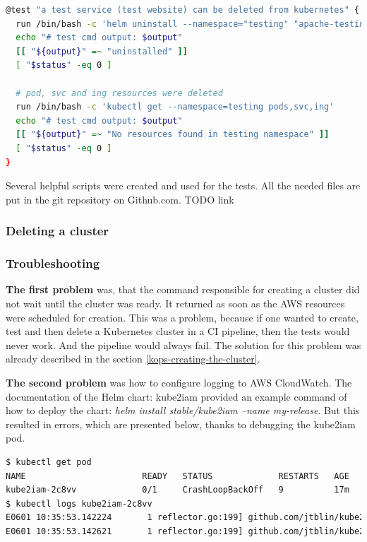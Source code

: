 \begin{lstlisting}[basicstyle=\tiny,caption={TODO},captionpos=b,language=Bash,xleftmargin=1cm]
@test "a test service (test website) can be deleted from kubernetes" {
  run /bin/bash -c 'helm uninstall --namespace="testing" "apache-testing" && kubectl delete -f config-map-www-contents.yaml && kubectl delete namespace "testing"'
  echo "# test cmd output: $output"
  [[ "${output}" =~ "uninstalled" ]]
  [ "$status" -eq 0 ]

  # pod, svc and ing resources were deleted
  run /bin/bash -c 'kubectl get --namespace=testing pods,svc,ing'
  echo "# test cmd output: $output"
  [[ "${output}" =~ "No resources found in testing namespace" ]]
  [ "$status" -eq 0 ]
}
\end{lstlisting}
Several helpful scripts were created and used for the tests. All the needed files are put in the git repository on Github.com. TODO link



\subsubsection{Deleting a cluster}

\subsubsection{Troubleshooting}

\textbf{The first problem} was, that the command responsible for creating a cluster did not wait until the cluster was ready. It returned as soon as the AWS resources were scheduled for creation. This was a problem, because if one wanted to create, test and then delete a Kubernetes cluster in a CI pipeline, then the tests would never work. And the pipeline would always fail. The solution for this problem was already described in the section \ref{kops-creating-the-cluster}.

\textbf{The second problem} was how to configure logging to AWS CloudWatch. The documentation of the Helm chart: kube2iam\cite{kube2iam} provided an example command of how to deploy the chart: \textit{helm install stable/kube2iam --name my-release}. But this resulted in errors, which are presented below, thanks to debugging the kube2iam pod.
\begin{lstlisting}[basicstyle=\tiny,caption={TODO},captionpos=b,language=Bash,xleftmargin=1cm]
$ kubectl get pod
NAME                       READY   STATUS             RESTARTS   AGE
kube2iam-2c8vv             0/1     CrashLoopBackOff   9          17m
$ kubectl logs kube2iam-2c8vv
E0601 10:35:53.142224       1 reflector.go:199] github.com/jtblin/kube2iam/vendor/k8s.io/client-go/tools/cache/reflector.go:94: Failed to list *v1.Pod: pods is forbidden: User "system:serviceaccount:default:default" cannot list resource "pods" in API group "" at the cluster scope
E0601 10:35:53.142621       1 reflector.go:199] github.com/jtblin/kube2iam/vendor/k8s.io/client-go/tools/cache/reflector.go:94: Failed to list *v1.Namespace: namespaces is forbidden: User "system:serviceaccount:default:default" cannot list resource "namespaces" in API group "" at the cluster scope
\end{lstlisting}

